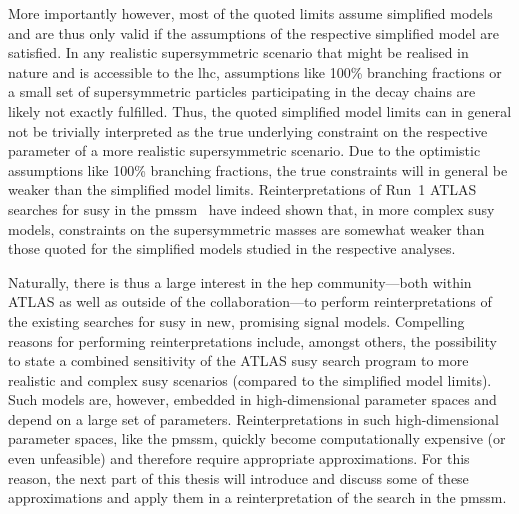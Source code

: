 More importantly however, most of the quoted limits assume simplified models and are thus only valid if the assumptions of the respective simplified model are satisfied. 
In any realistic supersymmetric scenario that might be realised in nature and is accessible to the \gls{lhc}, assumptions like 100\% branching fractions or a small set of supersymmetric particles participating in the decay chains are likely not exactly fulfilled. 
Thus, the quoted simplified model limits can in general not be trivially interpreted as the true underlying constraint on the respective parameter of a more realistic supersymmetric scenario. 
Due to the optimistic assumptions like 100\% branching fractions, the true constraints will in general be weaker than the simplified model limits.
Reinterpretations of Run~1 ATLAS searches for \gls{susy} in the \gls{pmssm}~\cite{pMSSM-scan-run1:2015baa} have indeed shown that, in more complex \gls{susy} models, constraints on the supersymmetric masses are somewhat weaker than those quoted for the simplified models studied in the respective analyses.

Naturally, there is thus a large interest in the \gls{hep} community---both within ATLAS as well as outside of the collaboration---to perform reinterpretations of the existing searches for \gls{susy} in new, promising signal models. 
Compelling reasons for performing reinterpretations include, amongst others, the possibility to state a combined sensitivity of the ATLAS \gls{susy} search program to more realistic and complex \gls{susy} scenarios (compared to the simplified model limits).
Such models are, however, embedded in high-dimensional parameter spaces and depend on a large set of parameters. Reinterpretations in such high-dimensional parameter spaces, like \eg the \gls{pmssm}, quickly become computationally expensive (or even unfeasible) and therefore require appropriate approximations. For this reason, the next part of this thesis will introduce and discuss some of these approximations and apply them in a reinterpretation of the \onelepton search in the \gls{pmssm}.


